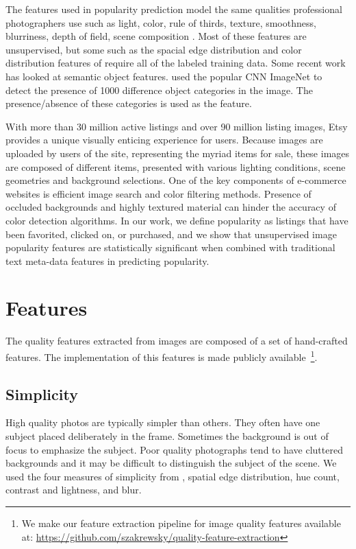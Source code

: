 \documentclass[conference,a4paper]{IEEEtran}
\begin{document}
The features used in popularity prediction model the same qualities professional photographers use such as light, color, rule of thirds, texture, smoothness, blurriness, depth of field, scene composition \cite{ke2006design} \cite{datta2006studying} \cite{chen2014aesthetic} \cite{wang2015automatic}.  Most of these features are unsupervised, but some such as the spacial edge distribution and color distribution features of \cite{ke2006design} require all of the labeled training data.  Some recent work has looked at semantic object features.  \cite{khosla2014makes} used the popular CNN ImageNet to detect the presence of 1000 difference object categories in the image.  The presence/absence of these categories is used as the feature.

With more than 30 million active listings and over 90 million listing images, Etsy provides a unique visually enticing experience
for users. Because images are uploaded by users of the site,
representing the myriad items for sale, these images are composed of different items, presented with various
lighting conditions, scene geometries and background selections. One of
the key components of e-commerce websites is
efficient image search and color filtering methods. Presence of occluded backgrounds and highly
textured material can hinder the accuracy of color detection
algorithms.  In our work, we define popularity as listings that have been favorited, clicked on, or purchased, and we show that unsupervised image popularity features are statistically significant when combined with traditional text meta-data features in predicting popularity.

\section{Features}
\label{sec:features}
The quality features extracted from images are composed of a set of hand-crafted features. The implementation of this features is made publicly available~\footnote{We make our feature extraction pipeline for image quality features available at: \url{https://github.com/szakrewsky/quality-feature-extraction}}. 

  \subsection{Simplicity}
  High quality photos are typically simpler than others.  They often have one subject placed deliberately in the frame.  Sometimes the background is out of focus to emphasize the subject.  Poor quality photographs tend to have cluttered backgrounds and it may be difficult to distinguish the subject of the scene.  We used the four measures of simplicity from \cite{ke2006design}, spatial edge distribution, hue count, contrast and lightness, and blur.
\end{document}
